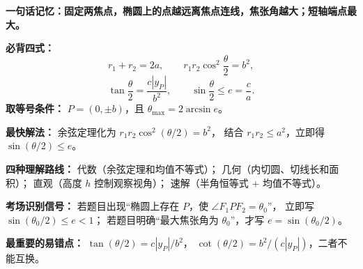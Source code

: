 \begin{summarybox}
\textbf{一句话记忆：固定两焦点，椭圆上的点越远离焦点连线，焦张角越大；短轴端点最大。}

\textbf{必背四式：}
\[
\boxed{r_1+r_2=2a},\qquad
\boxed{r_1r_2\cos^2\frac\theta2=b^2},
\]
\[
\boxed{\tan\frac\theta2=\frac{c|y_P|}{b^2}},\qquad
\boxed{\sin\frac\theta2\le e=\frac ca}.
\]
\textbf{取等号条件：}
$P=(0,\pm b)$，且
$\displaystyle\boxed{\theta_{\max}=2\arcsin e}$。

\textbf{最快解法：}
余弦定理化为
$r_1r_2\cos^2(\theta/2)=b^2$，
结合 $r_1r_2\le a^2$，立即得
$\sin(\theta/2)\le e$。

\textbf{四种理解路线：}
代数（余弦定理和均值不等式）；
几何（内切圆、切线长和面积）；
直观（高度 $h$ 控制观察视角）；
速解（半角恒等式 $+$ 均值不等式）。

\textbf{考场识别信号：}
若题目出现“椭圆上存在 $P$，使 $\angle F_1PF_2=\theta_0$”，
立即写
$\boxed{\sin(\theta_0/2)\le e<1}$；
若题目明确“最大焦张角为 $\theta_0$”，才写
$\boxed{e=\sin(\theta_0/2)}$。

\textbf{最重要的易错点：}
$\tan(\theta/2)=c|y_P|/b^2$，
$\cot(\theta/2)=b^2/(c|y_P|)$，二者不能互换。
\end{summarybox}

